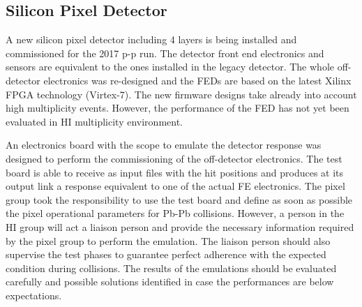 \subsection{Silicon Pixel Detector\label{subsec:SiPixel}}
A new silicon pixel detector including 4 layers is being installed and commissioned for the 2017 p-p run. The detector front end electronics and sensors are equivalent to the ones installed in the legacy detector. The whole off-detector electronics was re-designed and the FEDs are based on the latest Xilinx FPGA technology (Virtex-7). The new firmware designs take already into account high multiplicity events. However, the performance of the FED has not yet been evaluated in HI multiplicity environment. 

An electronics board with the scope to emulate the detector response was designed to perform the commissioning of the off-detector electronics. The test board is able to receive as input files with the hit positions and produces at its output link a response equivalent to one of the actual FE electronics. The pixel group took the responsibility to use the test board and define as soon as possible the pixel operational parameters for Pb-Pb collisions. However, a person in the HI group will act a liaison person and provide the necessary information required by the pixel group to perform the emulation. The liaison person should also supervise the test phases to guarantee perfect adherence with the expected condition during collisions. The results of the emulations should be evaluated carefully and possible solutions identified in case the performances are below expectations. 
